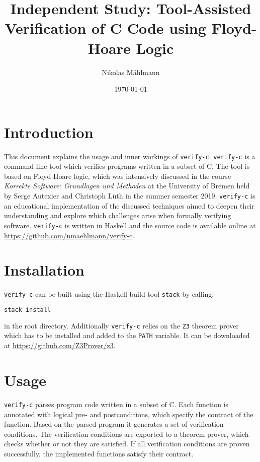 \documentclass[12pt]{article}
\begin{document}
\setlength{\parindent}{0pt}
\newcommand{\verifyc}[0]{\texttt{verify-c}\xspace}
\newcommand{\zthree}[0]{\texttt{Z3}\xspace}

\title{Independent Study: Tool-Assisted Verification of C Code using Floyd-Hoare Logic}
\author{Nikolas Mählmann}
\date{\today}

\maketitle

\section{Introduction}
This document explains the usage and inner workings of \verifyc. 
\verifyc is a command line tool which verifies programs written in a subset of C. 
The tool is based on Floyd-Hoare logic, which was intensively discussed in the course \emph{Korrekte Software: Grundlagen und Methoden} at the University of Bremen held by Serge Autexier and Christoph Lüth in the summer semester 2019. \verifyc is an educational implementation of the discussed techniques aimed to deepen their understanding and explore which challenges arise when formally verifying software. 
\verifyc is written in Haskell and the source code is available online at \url{https://github.com/nmaehlmann/verify-c}.

\section{Installation}
\verifyc can be built using the Haskell build tool \texttt{stack} by calling:

\begin{lstlisting}[language=bash]
stack install
\end{lstlisting}

in the root directory.
Additionally \verifyc relies on the \zthree theorem prover which has to be installed and added to the \texttt{PATH} variable.
It can be downloaded at \url{https://github.com/Z3Prover/z3}.
  

\section{Usage}
\label{usage}
\verifyc parses program code written in a subset of C.
Each function is annotated with logical pre- and postconditions, which specify the contract of the function.
Based on the parsed program it generates a set of verification conditions.
The verification conditions are exported to a theorem prover, which checks whether or not they are satisfied.
If all verification conditions are proven successfully, the implemented functions satisfy their contract.
\end{document}
